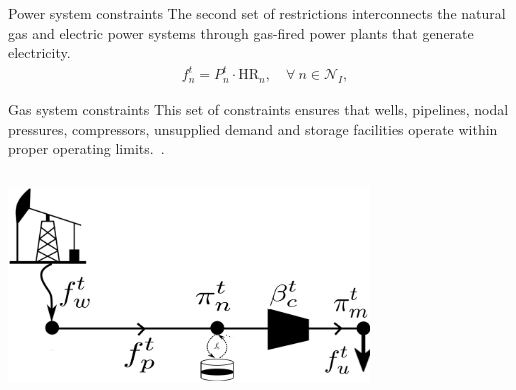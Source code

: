 \documentclass[hyperref={colorlinks,citecolor=blue,linkcolor=blue,urlcolor=blue}]{beamer}
\begin{document}
\begin{frame}{Power system constraints}
\vspace{1em}
The second set of restrictions interconnects the natural gas and electric power systems through gas-fired power plants that generate electricity.
\begin{align}
    &f_{n}^t = P_{n}^t \cdot \text{HR}_n, \quad \forall \ n \in \mathcal{N}_I, \label{eq:gas_power_relation} 
\end{align}
\end{frame}


\begin{frame}{Gas system constraints}
\footnotesize
This set of constraints ensures that wells, pipelines, nodal pressures, compressors, unsupplied demand and storage facilities operate within proper operating limits.~\cite{MPNG}.

\begin{columns}
\begin{column}{0.5\textwidth}
    \includegraphics[width=0.75\textwidth]{figures/gas_dummy.png}
\end{column}

\begin{column}{0.5\textwidth}
\scriptsize %


\end{column}
\end{columns}
\end{frame}
\end{document}
